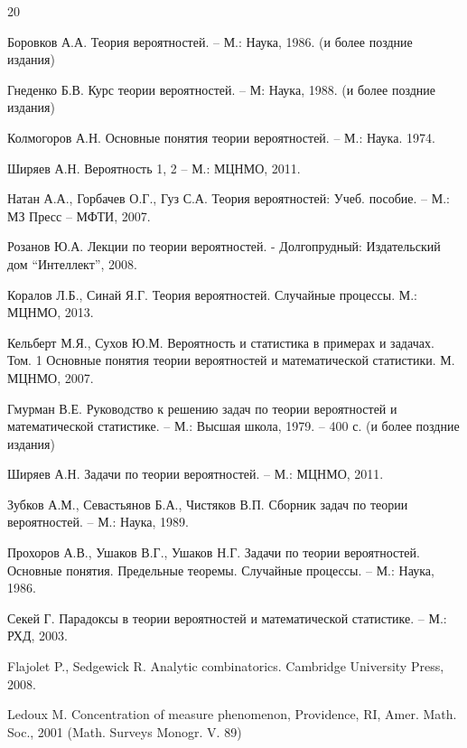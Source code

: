 \newpage


\renewcommand\refname{Литература}
\makeatletter
\renewcommand{\@biblabel}[1]{#1.}
\makeatother

\begin{thebibliography} {20}

Боровков А.А. Теория вероятностей. – М.: Наука, 1986.  (и более поздние издания)

Гнеденко Б.В. Курс теории вероятностей. – М: Наука, 1988. (и более поздние издания)

Колмогоров А.Н. Основные понятия теории вероятностей. – М.: Наука. 1974. 

Ширяев А.Н. Вероятность 1, 2 – М.: МЦНМО, 2011.


Натан А.А., Горбачев О.Г., Гуз С.А. Теория вероятностей: Учеб. пособие. – М.: МЗ Пресс – МФТИ, 2007. 

Розанов Ю.А. Лекции по теории вероятностей. - Долгопрудный: Издательский дом “Интеллект”, 2008. 

Коралов Л.Б., Синай Я.Г. Теория вероятностей. Случайные процессы. М.: МЦНМО, 2013.

Кельберт М.Я., Сухов Ю.М. Вероятность и статистика в примерах и задачах. Том. 1 Основные понятия теории вероятностей и математической статистики. М. МЦНМО, 2007.


Гмурман В.Е. Руководство к решению задач по теории вероятностей и математической статистике. – М.: Высшая школа, 1979. – 400 с. (и более поздние издания)

Ширяев А.Н. Задачи по теории вероятностей. – М.: МЦНМО, 2011. 


Зубков А.М., Севастьянов Б.А., Чистяков В.П. Сборник задач по теории вероятностей. – М.: Наука, 1989. 

Прохоров А.В., Ушаков В.Г., Ушаков Н.Г. Задачи по теории вероятностей. Основные понятия. Предельные теоремы. Случайные процессы. – М.: Наука, 1986. 


Секей Г. Парадоксы в теории вероятностей и математической статистике. – М.: РХД, 2003. 

Flajolet P., Sedgewick R. Analytic combinatorics. Cambridge University Press, 2008. 

Ledoux M. Concentration of measure phenomenon, Providence, RI, Amer. Math. Soc., 2001 (Math. Surveys Monogr. V. 89)


\end{thebibliography}
